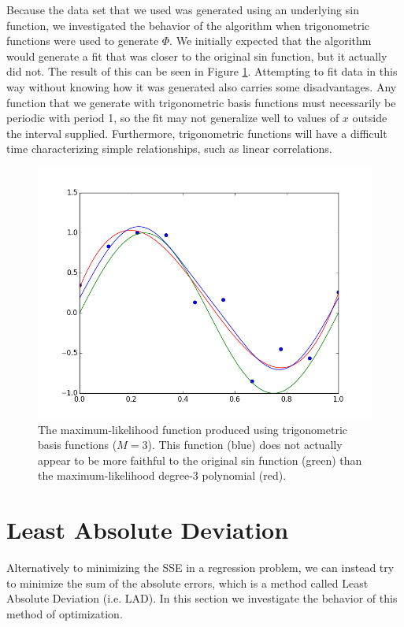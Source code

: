 \documentclass{article}
\begin{document}
Because the data set that we used was generated using an underlying sin function, we investigated the behavior of the algorithm when trigonometric functions were used to generate $\Phi$. We initially expected that the algorithm would generate a fit that was closer to the original sin function, but it actually did not. The result of this can be seen in Figure \ref{p2figure2}. Attempting to fit data in this way without knowing how it was generated also carries some disadvantages. Any function that we generate with trigonometric basis functions must necessarily be periodic with period 1, so the fit may not generalize well to values of $x$ outside the interval supplied. Furthermore, trigonometric functions will have a difficult time characterizing simple relationships, such as linear correlations.

\begin{figure}
\label{p2figure2}
\includegraphics[scale=0.4]{figure2_3.png}
\caption{The maximum-likelihood function produced using trigonometric basis functions ($M=3$). This function (blue) does not actually appear to be more faithful to the original sin function (green) than the maximum-likelihood degree-3 polynomial (red).}
\end{figure}

\section{Least Absolute Deviation}
Alternatively to minimizing the SSE in a regression problem, we can instead try to minimize the sum of the absolute errors, which is a method called Least Absolute Deviation (i.e. LAD). In this section we investigate the behavior of this method of optimization.
\end{document}
